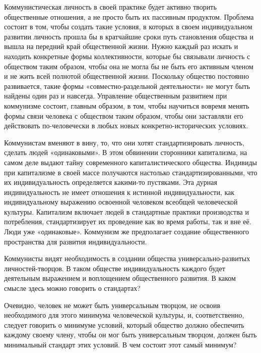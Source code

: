 \documentclass[12pt,a4paper,openany]{book}
\begin{document}
Коммунистическая личность в своей практике будет активно творить общественные отношения, а не просто быть их пассивным продуктом. Проблема состоит в том, чтобы создать такие условия, в которых в своем индивидуальном развитии личность прошла бы в кратчайшие сроки путь становления общества и вышла на передний край общественной жизни. Нужно каждый раз искать и находить конкретные формы коллективности, которые бы связывали личность с обществом таким образом, чтобы она не могла бы не быть его активным членом и не жить всей полнотой общественной жизни. Поскольку общество постоянно развивается, такие формы «совместно-раздельной деятельности» не могут быть найдены один раз и навсегда. Управление общественным развитием при коммунизме состоит, главным образом, в том, чтобы научиться вовремя менять формы связи человека с обществом таким образом, чтобы они заставляли его действовать по-человечески в любых новых конкретно-исторических условиях.

Коммунистам вменяют в вину, то, что они хотят стандартизировать личность, сделать людей «одинаковыми». В этом обвинении сторонники капитализма, на самом деле выдают тайну современного капиталистического общества. Индивиды при капитализме в своей массе получаются настолько стандартизированными, что их индивидуальность определяется какими-то пустяками. Эта дурная индивидуальность не имеет отношения к истинной индивидуальности, как индивидуальному выражению освоенной человеком всеобщей человеческой культуры. Капитализм включает людей в стандартные практики производства и потребления, стандартизирует их проведение как во время работы, так и вне её. Люди уже «одинаковые». Коммунизм же предполагает создание общественного пространства для развития индивидуальности.

Коммунисты видят необходимость в создании общества универсально-развитых личностей-творцов. В таком обществе индивидуальность каждого будет деятельным выражением и воплощением общественного развития. В каком смысле здесь можно говорить о стандартах?

Очевидно, человек не может быть универсальным творцом, не освоив необходимого для этого минимума человеческой культуры, и, соответственно, следует говорить о минимуме условий, который общество должно обеспечить каждому своему члену, чтобы он мог быть универсальным творцом, должен быть минимальный стандарт этих условий. В чем состоит этот самый минимум?
\end{document}
